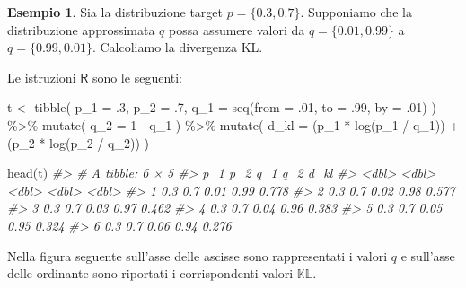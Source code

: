 \documentclass[
  10pt,
  italian,
  a4paper,
  extrafontsizes,onecolumn,openright
  ]{memoir}
\newenvironment{Shaded}{\begin{snugshade}}{\end{snugshade}}
\newcommand{\AttributeTok}[1]{\textcolor[rgb]{0.77,0.63,0.00}{#1}}
\newcommand{\CommentTok}[1]{\textcolor[rgb]{0.56,0.35,0.01}{\textit{#1}}}
\newcommand{\DecValTok}[1]{\textcolor[rgb]{0.00,0.00,0.81}{#1}}
\newcommand{\FunctionTok}[1]{\textcolor[rgb]{0.00,0.00,0.00}{#1}}
\newcommand{\NormalTok}[1]{#1}
\newcommand{\OtherTok}[1]{\textcolor[rgb]{0.56,0.35,0.01}{#1}}
\newcommand{\SpecialCharTok}[1]{\textcolor[rgb]{0.00,0.00,0.00}{#1}}
\newcommand{\R}{\textsf{R}} %
\theoremstyle{definition}
\theoremstyle{definition}
\newtheorem{example}{Esempio}[chapter]
\theoremstyle{definition}
\theoremstyle{definition}
\theoremstyle{remark}
\begin{document}
\begin{example}
\autocite[da][]{McElreath_rethinking} Sia la distribuzione target \(p = \{0.3, 0.7\}\). Supponiamo che la distribuzione approssimata \(q\) possa assumere valori da \(q = \{0.01, 0.99\}\) a \(q = \{0.99, 0.01\}\). Calcoliamo la divergenza KL.

Le istruzioni \(\R\) sono le seguenti:

\begin{Shaded}
\begin{Highlighting}[]
\NormalTok{t }\OtherTok{\textless{}{-}}
  \FunctionTok{tibble}\NormalTok{(}
    \AttributeTok{p\_1 =}\NormalTok{ .}\DecValTok{3}\NormalTok{,}
    \AttributeTok{p\_2 =}\NormalTok{ .}\DecValTok{7}\NormalTok{,}
    \AttributeTok{q\_1 =} \FunctionTok{seq}\NormalTok{(}\AttributeTok{from =}\NormalTok{ .}\DecValTok{01}\NormalTok{, }\AttributeTok{to =}\NormalTok{ .}\DecValTok{99}\NormalTok{, }\AttributeTok{by =}\NormalTok{ .}\DecValTok{01}\NormalTok{)}
\NormalTok{  ) }\SpecialCharTok{\%\textgreater{}\%}
  \FunctionTok{mutate}\NormalTok{(}
    \AttributeTok{q\_2 =} \DecValTok{1} \SpecialCharTok{{-}}\NormalTok{ q\_1}
\NormalTok{  ) }\SpecialCharTok{\%\textgreater{}\%}
  \FunctionTok{mutate}\NormalTok{(}
    \AttributeTok{d\_kl =}\NormalTok{ (p\_1 }\SpecialCharTok{*} \FunctionTok{log}\NormalTok{(p\_1 }\SpecialCharTok{/}\NormalTok{ q\_1)) }\SpecialCharTok{+}\NormalTok{ (p\_2 }\SpecialCharTok{*} \FunctionTok{log}\NormalTok{(p\_2 }\SpecialCharTok{/}\NormalTok{ q\_2))}
\NormalTok{  )}

\FunctionTok{head}\NormalTok{(t)}
\CommentTok{\#\textgreater{} \# A tibble: 6 × 5}
\CommentTok{\#\textgreater{}     p\_1   p\_2   q\_1   q\_2  d\_kl}
\CommentTok{\#\textgreater{}   \textless{}dbl\textgreater{} \textless{}dbl\textgreater{} \textless{}dbl\textgreater{} \textless{}dbl\textgreater{} \textless{}dbl\textgreater{}}
\CommentTok{\#\textgreater{} 1   0.3   0.7  0.01  0.99 0.778}
\CommentTok{\#\textgreater{} 2   0.3   0.7  0.02  0.98 0.577}
\CommentTok{\#\textgreater{} 3   0.3   0.7  0.03  0.97 0.462}
\CommentTok{\#\textgreater{} 4   0.3   0.7  0.04  0.96 0.383}
\CommentTok{\#\textgreater{} 5   0.3   0.7  0.05  0.95 0.324}
\CommentTok{\#\textgreater{} 6   0.3   0.7  0.06  0.94 0.276}
\end{Highlighting}
\end{Shaded}

\noindent
Nella figura seguente sull'asse delle ascisse sono rappresentati i valori \(q\) e sull'asse delle ordinante sono riportati i corrispondenti valori \(\mathbb{KL}\).


\end{example}
\end{document}
